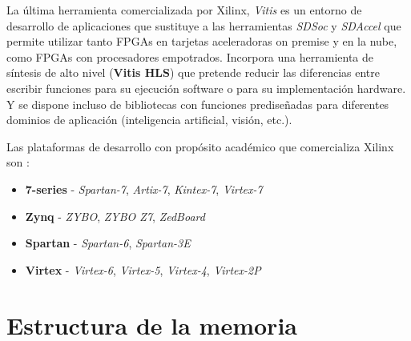La última herramienta comercializada por Xilinx, \textit{Vitis} es un entorno de desarrollo de aplicaciones que sustituye a las herramientas 
\textit{SDSoc} y \textit{SDAccel} que permite utilizar tanto FPGAs en tarjetas aceleradoras on premise y en la nube, como FPGAs con procesadores 
empotrados. Incorpora una herramienta de síntesis de alto nivel (\textbf{Vitis HLS}) que pretende reducir las diferencias entre escribir 
funciones para su ejecución software o para su implementación hardware. Y se dispone incluso de bibliotecas con funciones prediseñadas 
para diferentes dominios de aplicación (inteligencia artificial, visión, etc.).

Las plataformas de desarrollo con propósito académico que comercializa Xilinx son \cite{students}:

\begin{itemize}
    \item \textbf{7-series} - \textit{Spartan-7}, \textit{Artix-7}, \textit{Kintex-7}, \textit{Virtex-7}
    \item \textbf{Zynq} - \textit{ZYBO}, \textit{ZYBO Z7}, \textit{ZedBoard}
    \item \textbf{Spartan} - \textit{Spartan-6}, \textit{Spartan-3E}
    \item \textbf{Virtex} - \textit{Virtex-6}, \textit{Virtex-5}, \textit{Virtex-4}, \textit{Virtex-2P}
\end{itemize}


\section{Estructura de la memoria} 
 
 

